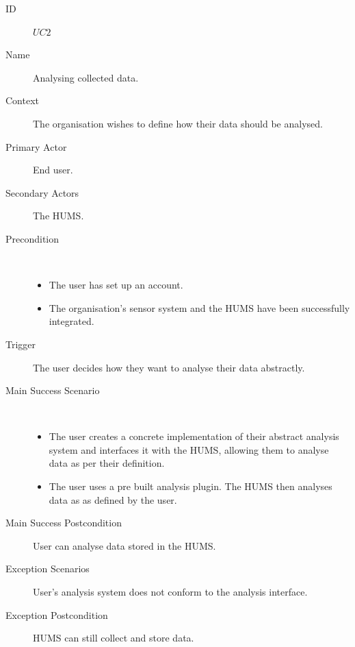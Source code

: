 \documentclass[10pt,a4paper]{article}
\begin{document}
\begin{description}
	\item[ID] $UC2$
	\item[Name] Analysing collected data.
	\item[Context] The organisation wishes to define how their data should be
	               analysed.
	\item[Primary Actor] End user.
	\item[Secondary Actors] The HUMS.
	\item[Precondition] ~
			\begin{itemize}
				\item The user has set up an account.
				\item The organisation's sensor system and the HUMS have been
				      successfully integrated.
			\end{itemize}
	\item[Trigger] The user decides how they want to analyse their data
	               abstractly.
	\item[Main Success Scenario] ~
			\begin{itemize}
				\item The user creates a concrete implementation of their abstract
				      analysis system and interfaces it with the HUMS, allowing them to
				      analyse data as per their definition.
				\item The user uses a pre built analysis plugin. The HUMS
				      then analyses data as as defined by the user.
			\end{itemize}
	\item[Main Success Postcondition] User can analyse data stored in the HUMS.
	\item[Exception Scenarios] User's analysis system does not conform to the
			analysis interface.
	\item[Exception Postcondition] HUMS can still collect and store data.
\end{description}

\vspace{\baselineskip}
\end{document}
